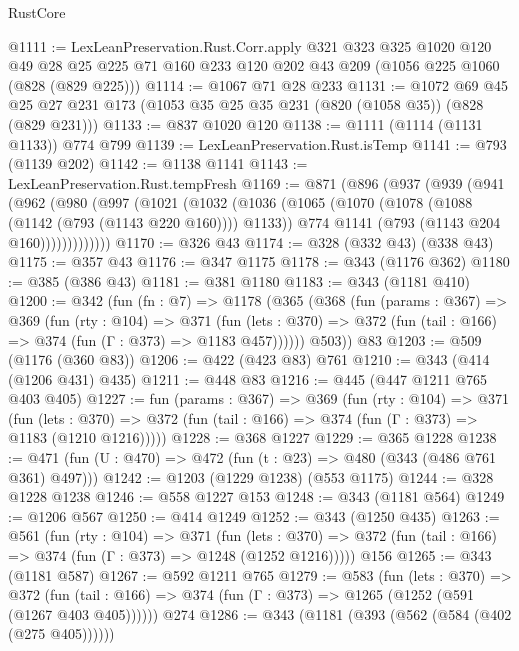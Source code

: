 \begin{lexlean}{RustCore}
\begin{coremodule}
@1111 := LexLeanPreservation.Rust.Corr.apply
    @321
    @323
    @325
    @1020
    @120
    @49
    @28
    @25
    @225
    @71
    @160
    @233
    @120
    @202
    @43
    @209
    (@1056 @225 @1060 (@828 (@829 @225)))
@1114 := @1067 @71 @28 @233
@1131 := @1072
    @69
    @45
    @25
    @27
    @231
    @173
    (@1053 @35 @25 @35 @231 (@820 (@1058 @35)) (@828 (@829 @231)))
@1133 := @837 @1020 @120
@1138 := @1111 (@1114 (@1131 @1133)) @774 @799
@1139 := LexLeanPreservation.Rust.isTemp
@1141 := @793 (@1139 @202)
@1142 := @1138 @1141
@1143 := LexLeanPreservation.Rust.tempFresh
@1169 := @871
    (@896
      (@937
        (@939
          (@941
            (@962
              (@980
                (@997
                  (@1021
                    (@1032
                      (@1036
                        (@1065
                          (@1070 (@1078 (@1088 (@1142 (@793 (@1143 @220 @160)))) @1133))
                          @774
                          @1141
                          (@793 (@1143 @204 @160)))))))))))))
@1170 := @326 @43
@1174 := @328 (@332 @43) (@338 @43)
@1175 := @357 @43
@1176 := @347 @1175
@1178 := @343 (@1176 @362)
@1180 := @385 (@386 @43)
@1181 := @381 @1180
@1183 := @343 (@1181 @410)
@1200 := @342
    (fun (fn : @7) =>
    @1178
      (@365
        (@368
          (fun (params : @367) =>
          @369
            (fun (rty : @104) =>
            @371
              (fun (lets : @370) =>
              @372 (fun (tail : @166) => @374 (fun (Γ : @373) => @1183 @457))))))
        @503))
    @83
@1203 := @509 (@1176 (@360 @83))
@1206 := @422 (@423 @83) @761
@1210 := @343 (@414 (@1206 @431) @435)
@1211 := @448 @83
@1216 := @445 (@447 @1211 @765 @403 @405)
@1227 := fun (params : @367) =>
  @369
    (fun (rty : @104) =>
    @371
      (fun (lets : @370) =>
      @372 (fun (tail : @166) => @374 (fun (Γ : @373) => @1183 (@1210 @1216)))))
@1228 := @368 @1227
@1229 := @365 @1228
@1238 := @471 (fun (U : @470) => @472 (fun (t : @23) => @480 (@343 (@486 @761 @361) @497)))
@1242 := @1203 (@1229 @1238) (@553 @1175)
@1244 := @328 @1228 @1238
@1246 := @558 @1227 @153
@1248 := @343 (@1181 @564)
@1249 := @1206 @567
@1250 := @414 @1249
@1252 := @343 (@1250 @435)
@1263 := @561
    (fun (rty : @104) =>
    @371
      (fun (lets : @370) =>
      @372 (fun (tail : @166) => @374 (fun (Γ : @373) => @1248 (@1252 @1216)))))
    @156
@1265 := @343 (@1181 @587)
@1267 := @592 @1211 @765
@1279 := @583
    (fun (lets : @370) =>
    @372 (fun (tail : @166) => @374 (fun (Γ : @373) => @1265 (@1252 (@591 (@1267 @403 @405))))))
    @274
@1286 := @343 (@1181 (@393 (@562 (@584 (@402 (@275 @405))))))

\end{coremodule}
\end{lexlean}
